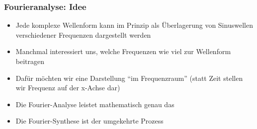 \documentclass{beamer}
\begin{document}
\begin{frame}
\frametitle{Fourieranalyse: Idee}


\begin{itemize}
\item
Jede komplexe Wellenform kann im Prinzip als Überlagerung von Sinuswellen verschiedener Frequenzen dargestellt werden
\item
Manchmal interessiert uns, welche Frequenzen wie viel zur Wellenform beitragen
\item
Dafür möchten wir eine Darstellung ``im Frequenzraum'' (statt Zeit stellen wir Frequenz auf der x-Achse dar)
\item
Die Fourier-Analyse leistet mathematisch genau das  
\item
Die Fourier-Synthese ist der umgekehrte Prozess
\end{itemize}


\end{frame}
\end{document}
